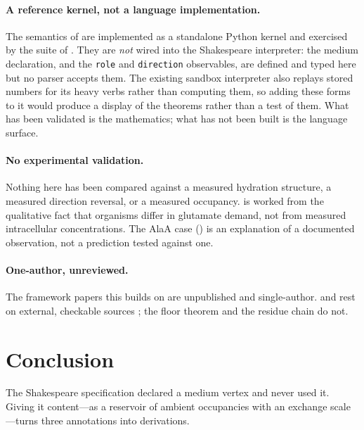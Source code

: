 \documentclass[11pt,twocolumn,a4paper]{article}
\theoremstyle{thmstyle}
\theoremstyle{definition}
\theoremstyle{remark}
\newcommand{\shk}[1]{\texttt{#1}}
\begin{document}
\paragraph{A reference kernel, not a language implementation.} The
semantics of  are implemented
as a standalone Python kernel and exercised by the suite of
. They are \emph{not} wired into the Shakespeare
interpreter: the medium declaration, and the \shk{role} and
\shk{direction} observables, are defined and typed here but no parser
accepts them. The existing sandbox interpreter also replays stored
numbers for its heavy verbs rather than computing them, so adding these
forms to it would produce a display of the theorems rather than a test of
them. What has been validated is the mathematics; what has not been built
is the language surface.

\paragraph{No experimental validation.} Nothing here has been compared
against a measured hydration structure, a measured direction reversal, or
a measured occupancy.  is worked from the
qualitative fact that organisms differ in glutamate demand, not from
measured intracellular concentrations. The AlaA case
() is an explanation of a documented observation, not a
prediction tested against one.

\paragraph{One-author, unreviewed.} The framework papers this builds on
are unpublished and single-author.  and
 rest on external, checkable sources
\citep{bansal2022rhea,doerr2025limits}; the floor theorem and the residue
chain do not.

\section{Conclusion}
\label{sec:conclusion}

The Shakespeare specification declared a medium vertex and never used it.
Giving it content---as a reservoir of ambient occupancies with an exchange
scale---turns three annotations into derivations.
\end{document}
